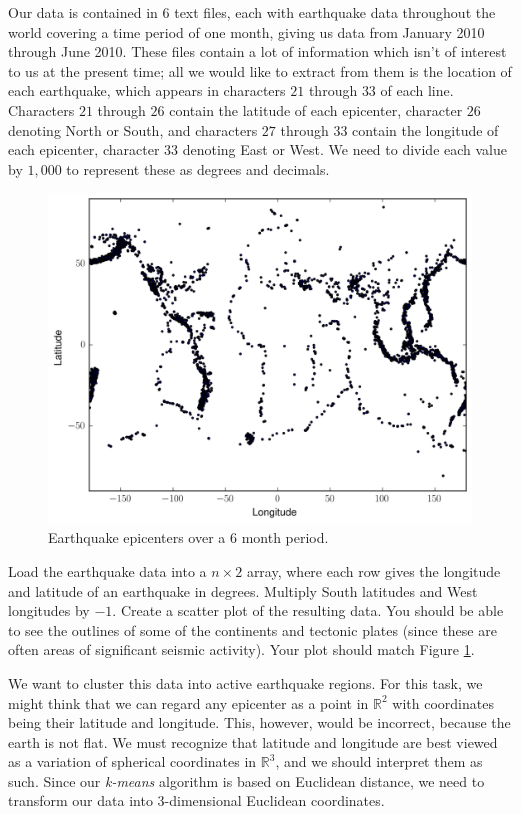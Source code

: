 Our data is contained in 6 text files, each with earthquake data throughout the world covering a time period of one month, giving us data from January 2010 through June 2010.
These files contain a lot of information which isn't of interest to us at the present time; all we would like to extract from them is the location of each earthquake, which appears in characters $21$ through $33$ of each line.
Characters $21$ through $26$ contain the latitude of each epicenter, character $26$ denoting North or South, and characters $27$ through $33$ contain the longitude of each epicenter, character $33$ denoting East or West.
We need to divide each value by $1,000$ to represent these as degrees and decimals.
\begin{figure}
	\centering
	\includegraphics[width=\textwidth]{earthquakes.png}
	\caption{Earthquake epicenters over a 6 month period.}
	\label{fig:earthquakes}
\end{figure}
\begin{problem}
Load the earthquake data into a $n\times 2$ array, where each row gives the longitude and latitude of an earthquake in degrees.
Multiply South latitudes and West longitudes by $-1$.
Create a scatter plot of the resulting data. You should be able to see the outlines of some of the continents and tectonic plates (since these are often areas of significant seismic activity). Your plot should match Figure \ref{fig:earthquakes}.
\end{problem}

We want to cluster this data into active earthquake regions.
For this task, we might think that we can regard any epicenter as a point in $\mathbb{R}^{2}$ with coordinates being their latitude and longitude.
This, however, would be incorrect, because the earth is not flat. We must recognize that latitude and longitude are best viewed as a variation of spherical coordinates in $\mathbb{R}^{3}$, and we should interpret them as such.
Since our \emph{k-means} algorithm is based on Euclidean distance, we need to transform our data into 3-dimensional Euclidean coordinates.


